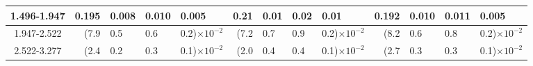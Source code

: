 \begin{table}[!htbp]
{\begin{tabular}{ | c | r@{$\pm$}l@{$\pm$}l@{$\pm$}l | r@{$\pm$}l@{$\pm$}l@{$\pm$}l | r@{$\pm$}l@{$\pm$}l@{$\pm$}l |}
1.496-1.947 & 0.195&0.008&0.010&0.005 & 0.21&0.01&0.02&0.01 & 0.192&0.010&0.011&0.005 \\ \hline
1.947-2.522 & (7.9&0.5&0.6&0.2)$\times 10^{-2}$ & (7.2&0.7&0.9&0.2)$\times 10^{-2}$ & (8.2&0.6&0.8&0.2)$\times 10^{-2}$ \\ \hline
2.522-3.277 & (2.4&0.2&0.3&0.1)$\times 10^{-2}$ & (2.0&0.4&0.4&0.1)$\times 10^{-2}$ & (2.7&0.3&0.3&0.1)$\times 10^{-2}$ \\ \hline
\end{tabular}}
\end{table}
\clearpage\clearpage